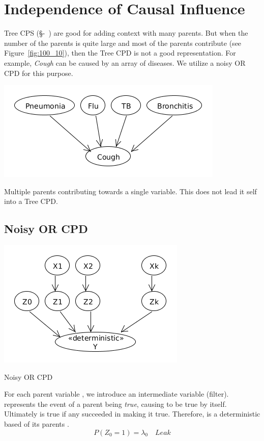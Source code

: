 \section{Independence of Causal Influence}\label{sec:independenceOfCausalInfluence}
Tree CPS (\S-~) are good for adding context with many parents. But when the number of the parents is quite large and most of the parents contribute (see Figure~\ref{fig:100_10}), then the Tree CPD is not a good representation.  For example, \emph{Cough} can be caused by an array of diseases.  We utilize a noisy OR CPD for this purpose.

\begin{marginfigure}
\includegraphics{images/100_10}
\caption{Multiple parents contributing towards a single variable.  This does not lead it self into a Tree CPD.}
\label{fig:100_10}
\end{marginfigure}

\subsection{Noisy OR CPD}
\begin{marginfigure}
\includegraphics{images/100_11}
\caption{Noisy OR CPD}
\label{fig:100_11}
\end{marginfigure}

For each parent variable  , we introduce an intermediate variable  (filter).  represents the event of a parent  being \emph{true}, causing  to be true by itself.  Ultimately  is true if any  succeeded in making it true.  Therefore,  is a deterministic  based of its parents .
\[ P(Z_0 =1) = \lambda_0  \quad Leak\]

